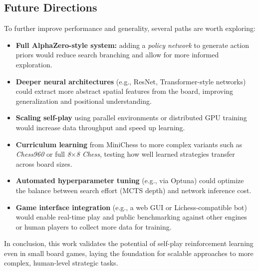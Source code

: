 \documentclass{report}
\begin{document}
\subsection*{Future Directions}
 
To further improve performance and generality, several paths are worth exploring:
 
\begin{itemize}
  \item \textbf{Full AlphaZero-style system:} adding a \textit{policy network} to generate action priors would reduce search branching and allow for more informed exploration.
  \item \textbf{Deeper neural architectures} (e.g., ResNet, Transformer-style networks) could extract more abstract spatial features from the board, improving generalization and positional understanding.
  \item \textbf{Scaling self-play} using parallel environments or distributed GPU training would increase data throughput and speed up learning.
  \item \textbf{Curriculum learning} from MiniChess to more complex variants such as \textit{Chess960} or full \textit{8$\times$8 Chess}, testing how well learned strategies transfer across board sizes.
  \item \textbf{Automated hyperparameter tuning} (e.g., via Optuna) could optimize the balance between search effort (MCTS depth) and network inference cost.
  \item \textbf{Game interface integration} (e.g., a web GUI or Lichess-compatible bot) would enable real-time play and public benchmarking against other engines or human players to collect more data for training.
\end{itemize}
 
\noindent In conclusion, this work validates the potential of self-play reinforcement learning even in small board games, laying the foundation for scalable approaches to more complex, human-level strategic tasks.
\end{document}
